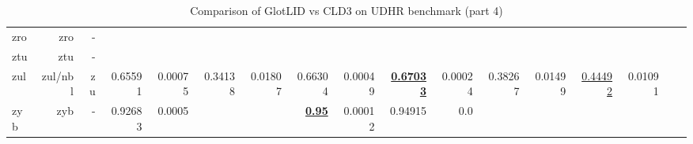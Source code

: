\documentclass[11pt]{article}
\def\udhr{UDHR\xspace}
\begin{document}
\begin{table*}[h]
{\begin{tabular}{lrrrrrrrrrrrrrrrr}
zro         & zro         & -         &          &          &          &          &          &          &          &          &          &          &          &          \\
ztu         & ztu         & -         &          &          &          &          &          &          &          &          &          &          &          &          \\
zul         & zul/nbl         & zu         & 0.65591         & 0.00075         & 0.34138         & 0.01807         & 0.66304         & 0.00049         & \textbf{\underline{0.67033}}         & 0.00024         & 0.38267         & 0.01499         & \underline{0.44492}         & 0.01091         \\
zyb         & zyb         & -         & 0.92683         & 0.0005         &          &          & \textbf{\underline{0.95}}         & 0.00012         & 0.94915         & 0.0         &          &          &          &          \\
\end{tabular}
}
\caption{Comparison of GlotLID vs CLD3 on \udhr benchmark (part 4)}
\label{tab:appendix_glotlid_cld3_udhr_4}
\end{table*}
 
\end{document}
